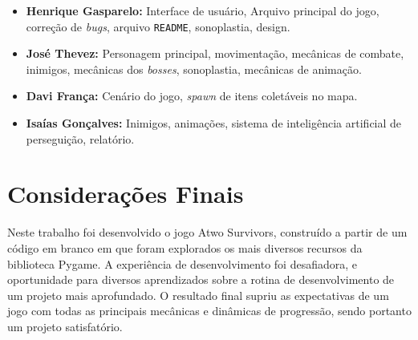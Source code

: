 \documentclass[a4paper,12pt]{article}
\begin{document}
\begin{itemize}
    \item \textbf{Henrique Gasparelo:} Interface de usuário, Arquivo principal do jogo, correção de \textit{bugs}, arquivo \texttt{README}, sonoplastia, design.
    \item \textbf{José Thevez:} Personagem principal, movimentação, mecânicas de combate, inimigos, mecânicas dos \textit{bosses}, sonoplastia, mecânicas de animação.
    \item \textbf{Davi França:} Cenário do jogo, \textit{spawn} de itens coletáveis no mapa.
    \item \textbf{Isaías Gonçalves:} Inimigos, animações, sistema de inteligência artificial de perseguição, relatório.
\end{itemize} 




\section{Considerações Finais}

Neste trabalho foi desenvolvido o jogo Atwo Survivors, construído a partir de um código em branco em que foram explorados os mais diversos recursos da biblioteca Pygame. A experiência de desenvolvimento foi desafiadora, e oportunidade para diversos aprendizados sobre a rotina de desenvolvimento de um projeto mais aprofundado. O resultado final supriu as expectativas de um jogo com todas as principais mecânicas e dinâmicas de progressão, sendo portanto um projeto satisfatório. 



\end{document}
